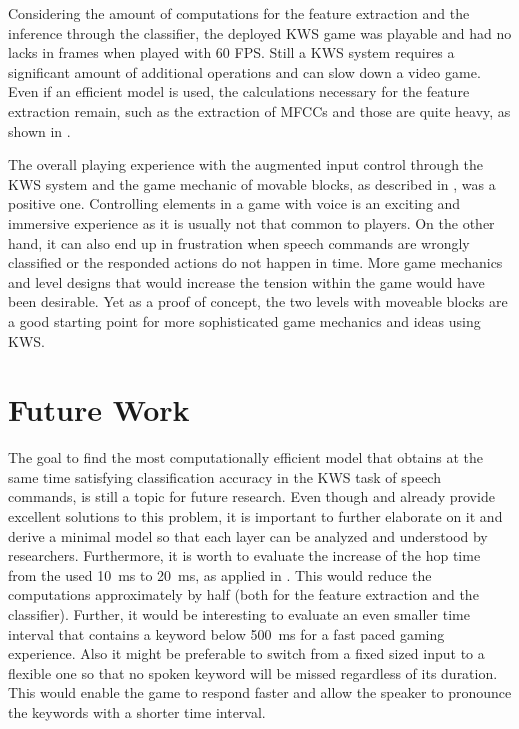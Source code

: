 Considering the amount of computations for the feature extraction and the inference through the classifier, the deployed KWS game was playable and had no lacks in frames when played with 60 FPS.
Still a KWS system requires a significant amount of additional operations and can slow down a video game.
Even if an efficient model is used, the calculations necessary for the feature extraction remain, such as the extraction of MFCCs and those are quite heavy, as shown in .

The overall playing experience with the augmented input control through the KWS system and the game mechanic of movable blocks, as described in , was a positive one.
Controlling elements in a game with voice is an exciting and immersive experience as it is usually not that common to players.
On the other hand, it can also end up in frustration when speech commands are wrongly classified or the responded actions do not happen in time.
More game mechanics and level designs that would increase the tension within the game would have been desirable.
Yet as a proof of concept, the two levels with moveable blocks are a good starting point for more sophisticated game mechanics and ideas using KWS.



\section{Future Work}
The goal to find the most computationally efficient model that obtains at the same time satisfying classification accuracy in the KWS task of speech commands, is still a topic for future research.
Even though \cite{Zhang2017} and \cite{Peter2020} already provide excellent solutions to this problem, it is important to further elaborate on it and derive a minimal model so that each layer can be analyzed and understood by researchers.
Furthermore, it is worth to evaluate the increase of the hop time from the used \SI{10}{\milli\second} to \SI{20}{\milli\second}, as applied in \cite{Peter2020}.
This would reduce the computations approximately by half (both for the feature extraction and the classifier).
Further, it would be interesting to evaluate an even smaller time interval that contains a keyword below \SI{500}{\milli\second} for a fast paced gaming experience.
Also it might be preferable to switch from a fixed sized input to a flexible one so that no spoken keyword will be missed regardless of its duration.
This would enable the game to respond faster and allow the speaker to pronounce the keywords with a shorter time interval.


